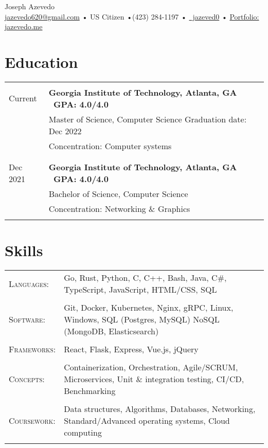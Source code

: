 \documentclass[a4paper,11pt]{article}
\newcommand{\lcolwidth}{2.2cm}
\newcommand{\lcolwidthinner}{2.1cm}
\newcommand{\rcolwidth}{16.2cm}
\newenvironment{rsection}[1]
  {
    \section{#1}
    \begin{tabular}{>{\raggedleft\arraybackslash}p{\lcolwidth}|p{\rcolwidth}}
   } {
    \\\multicolumn{2}{c}{} \\[-10pt]
    \end{tabular}
  }
\newcommand{\rheader}[2]{
    \multirow[t]{2}{*}{
        \begin{minipage}[t]{\lcolwidthinner}
            \begin{flushright}
                \textsc{#1}
            \end{flushright}
        \end{minipage}
    } & \textbf{#2}
}
\newcommand{\rline}[1]{\\& #1}
\newcommand{\ritem}[2][ •\hspace{3pt}]{\\[-2pt]& \footnotesize{#1#2}}
\newenvironment{rskills}[1][Skills]
  {
    \section{#1}
    \begin{tabular}{>{\raggedleft\arraybackslash}p{\lcolwidth}p{\rcolwidth}}
    } {
    \end{tabular}
  }
\newcommand{\rskill}[2]{\textsc{#1}:& \small #2 \\ & \\[-14pt]}
\newcommand{\rskip}{\\\multicolumn{2}{c}{} \\[-5pt]}
\newcommand{\rdot}{\xspace\hspace{0pt}•\hspace{3pt}\xspace}
\begin{document}
\hsize=7.5in \vsize=11in
\hoffset=-0.65in \voffset=-0.52in
\pdfpagewidth=8.5in
\pdfpageheight=11in
\pagestyle{empty}

\newcommand{\at}{@}
\newcommand{\gmaildotcom}{gmail.com}

\begin{center}
     \Huge       Joseph Azevedo
  \\[2pt] \normalsize \href{mailto:jazevedo620\at\gmaildotcom}{jazevedo620\at\gmaildotcom}
    \rdot US Citizen \rdot (423) 284-1197 \rdot
\href{https://github.com/jazeved0}{\faGithub\ jazeved0} \rdot
    \href{https://jazevedo.me}{Portfolio: jazevedo.me} \\[6pt]
\end{center}
\vspace{11pt}


\begin{rsection}{Education}
  \rheader{Jan 2022 -\\[-1pt] Current}{Georgia Institute of Technology,
    {\normalfont Atlanta, GA \hfill\  GPA: 4.0/4.0\ }}
  \rline{Master of Science, Computer Science \hfill Graduation date: Dec 2022}
  \vspace{2pt}
  \ritem[]{Concentration: Computer systems}
  \rskip
  \rheader{Jun 2018 -\\[-1pt] Dec 2021}{Georgia Institute of Technology,
    {\normalfont Atlanta, GA \hfill\  GPA: 4.0/4.0\ }}
  \rline{Bachelor of Science, Computer Science}
  \vspace{2pt}
  \ritem[]{Concentration: Networking \& Graphics}
\end{rsection}
\vspace{-4pt}


\begin{rskills}
  \rskill{Languages}  {Go, Rust, Python, C, C++, Bash, Java, C\#,
                      TypeScript, JavaScript, HTML/CSS, SQL}
  \rskill{Software}   {Git, Docker, Kubernetes, Nginx, gRPC, Linux, Windows, SQL (Postgres, MySQL)
                      NoSQL (MongoDB, Elasticsearch)}
  \rskill{Frameworks} {React, Flask, Express, Vue.js, jQuery}
  \rskill{Concepts}   {Containerization, Orchestration, Agile/SCRUM, Microservices,
                      Unit \& integration testing, CI/CD, Benchmarking}
  \rskill{Coursework} {Data structures, Algorithms, Databases, Networking,
                      Standard/Advanced operating systems, Cloud computing}
\end{rskills}
\vspace{7pt}
\end{document}
